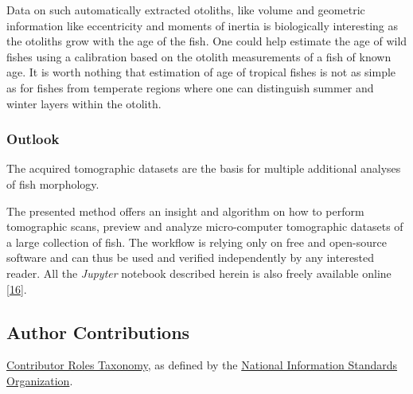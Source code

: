 Data on such automatically extracted otoliths, like volume and geometric information like eccentricity and moments of inertia is biologically interesting as the otoliths grow with the age of the fish.
One could help estimate the age of wild fishes using a calibration based on the otolith measurements of a fish of known age.
It is worth nothing that estimation of age of tropical fishes is not as simple as for fishes from temperate regions where one can distinguish summer and winter layers within the otolith.

\hypertarget{outlook}{%
\subsubsection{Outlook}\label{outlook}}

The acquired tomographic datasets are the basis for multiple additional analyses of fish morphology.

The presented method offers an insight and algorithm on how to perform tomographic scans, preview and analyze micro-computer tomographic datasets of a large collection of fish.
The workflow is relying only on free and open-source software and can thus be used and verified independently by any interested reader.
All the \emph{Jupyter} notebook described herein is also freely available online {[}\protect\hyperlink{ref-1HteOscVd}{16}{]}.

\hypertarget{author-contributions}{%
\subsection{Author Contributions}\label{author-contributions}}

\href{https://credit.niso.org/}{Contributor Roles Taxonomy}, as defined by the \href{https://credit.niso.org/contributor-roles-defined/}{National Information Standards Organization}.

